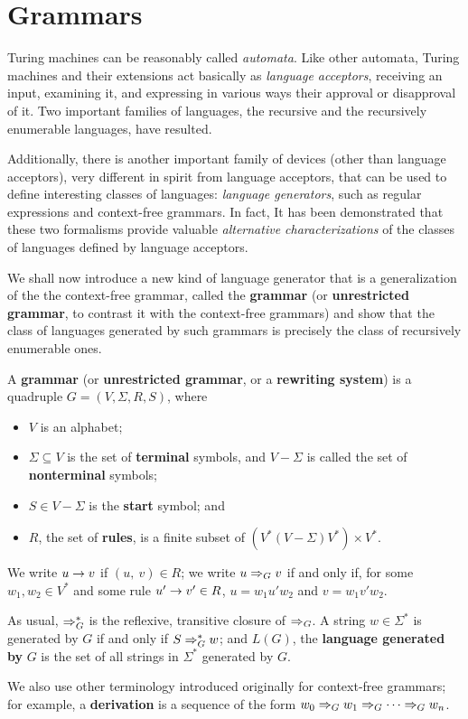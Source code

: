 \section{Grammars}
\label{sec:grammars}

Turing machines can be reasonably called \textit{automata}. Like other automata, Turing machines and their extensions act basically as \textit{language acceptors}, receiving an input, examining it, and expressing in various ways their approval or disapproval of it. Two important families of languages, the recursive and the recursively enumerable languages, have resulted. 

Additionally, there is another important family of devices (other than language acceptors), very different in spirit from language acceptors, that can be used to define interesting classes of languages: \textit{language generators}, such as regular expressions and context-free grammars. In fact, It has been demonstrated that these two formalisms provide valuable \textit{alternative characterizations} of the classes of languages defined by language acceptors. 

We shall now introduce a new kind of language generator that is a generalization of the the context-free grammar, called the \textbf{grammar} (or \textbf{unrestricted grammar}, to contrast it with the context-free grammars) and show that the class of languages generated by such grammars is precisely the class of recursively enumerable ones. 

\begin{definition}{}
A \textbf{grammar} (or \textbf{unrestricted grammar}, or a \textbf{rewriting   system}) is a quadruple $G = (V, \Sigma, R, S)$, where
\begin{itemize}
  \item $V$ is an alphabet; 
  \item $\Sigma \subseteq V$ is the set of \textbf{terminal} symbols, and $V - \Sigma$ is called the set of \textbf{nonterminal} symbols;
  \item $S \in V - \Sigma$ is the \textbf{start} symbol; and
  \item $R$, the set of \textbf{rules}, is a finite subset of ${(V^*(V - \Sigma)V^*) \times V^*}$.
\end{itemize}

\quad We write $u \rightarrow v$ if $(u,\ v) \in R$; we write $u \Rightarrow_G v$ if and only if, for some $w_1, w_2 \in V^*$ and some rule $u' \rightarrow v' \in R$, $u = w_1u'w_2$ and $v = w_1v'w_2$.

\quad As usual, $\Rightarrow_G^*$ is the reflexive, transitive closure of $\Rightarrow_G$. A string $w \in \Sigma^*$ is generated by $G$ if and only if $S \Rightarrow_G^* w$; and $L(G)$, the \textbf{language generated by} $G$ is the set of all strings in $\Sigma^*$ generated by $G$.

\quad We also use other terminology introduced originally for context-free grammars; for example, a \textbf{derivation} is a sequence of the form ${w_0 \Rightarrow_G w_1 \Rightarrow_G \cdots \Rightarrow_G w_n}$.
\end{definition}

